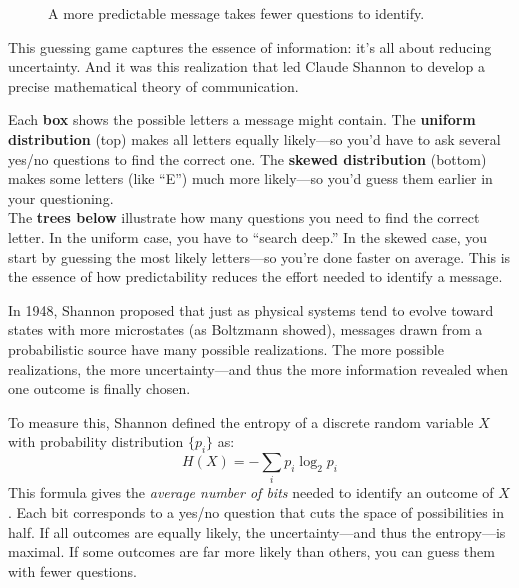 \begin{figure}[H]
\caption{A more predictable message takes fewer questions to identify.}
\end{figure}


This guessing game captures the essence of information: it’s all about reducing uncertainty. And it was this realization that led Claude Shannon to develop a precise mathematical theory of communication.

Each \textbf{box} shows the possible letters a message might contain. The \textbf{uniform distribution} (top) makes all letters equally likely—so you'd have to ask several yes/no questions to find the correct one. The \textbf{skewed distribution} (bottom) makes some letters (like “E”) much more likely—so you’d guess them earlier in your questioning.
\\
The \textbf{trees below} illustrate how many questions you need to find the correct letter. In the uniform case, you have to “search deep.” In the skewed case, you start by guessing the most likely letters—so you're done faster on average. This is the essence of how predictability reduces the effort needed to identify a message.

In 1948, Shannon proposed that just as physical systems tend to evolve toward states with more microstates (as Boltzmann showed), messages drawn from a probabilistic source have many possible realizations. The more possible realizations, the more uncertainty—and thus the more information revealed when one outcome is finally chosen.

To measure this, Shannon defined the entropy of a discrete random variable \( X \) with probability distribution \( \{p_i\} \) as:
\[
H(X) = -\sum_i p_i \log_2 p_i
\]
This formula gives the \emph{average number of bits} needed to identify an outcome of \( X \). Each bit corresponds to a yes/no question that cuts the space of possibilities in half. If all outcomes are equally likely, the uncertainty—and thus the entropy—is maximal. If some outcomes are far more likely than others, you can guess them with fewer questions.


